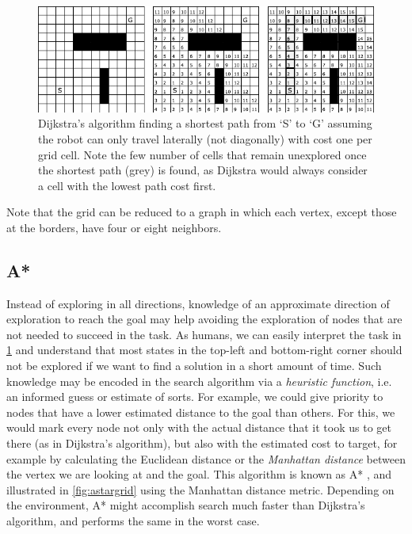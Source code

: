 \begin{figure}[htb]
    \centering
    \includegraphics[width=\textwidth]{figs/dijkstragrid.pdf}
    \caption{Dijkstra's algorithm finding a shortest path from `S' to `G' assuming the robot can only travel laterally (not diagonally) with cost one per grid cell. Note the few number of cells that remain unexplored once the shortest path (grey) is found, as Dijkstra would always consider a cell with the lowest path cost first.\label{fig:dijkstragrid}}
\end{figure}

Note that the grid can be reduced to a graph in which each vertex, except those at the borders, have four or eight neighbors.

\subsection{A*}\label{sec:astar}

Instead of exploring in all directions, knowledge of an approximate direction of exploration to reach the goal may help avoiding the exploration of nodes that are not needed to succeed in the task.
As humans, we can easily interpret the task in \cref{fig:dijkstragrid} and understand that most states in the top-left and bottom-right corner should not be explored if we want to find a solution in a short amount of time.
Such knowledge may be encoded in the search algorithm via a \textsl{heuristic function}, i.e. an informed guess or estimate of sorts. For example, we could give priority to nodes that have a lower estimated distance to the goal than others.
For this, we would mark every node not only with the actual distance that it took us to get there (as in Dijkstra's algorithm), but also with the estimated cost to target, for example by calculating the Euclidean distance or the \textsl{Manhattan distance} between the vertex we are looking at and the goal.
This algorithm is known as A* \cite{hart1968formal}, and illustrated in \cref{fig:astargrid} using the Manhattan distance metric. Depending on the environment, A* might accomplish search much faster than Dijkstra's algorithm, and performs the same in the worst case.

